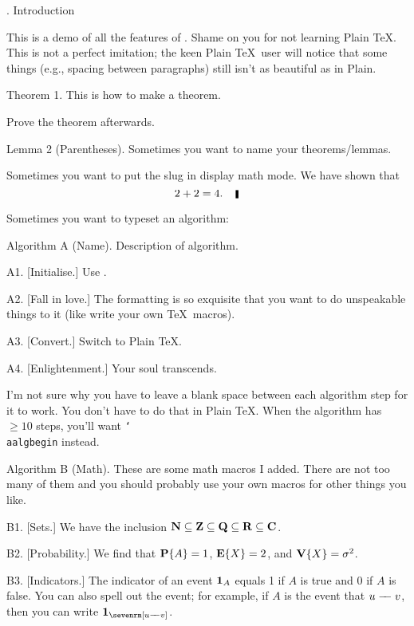 \documentclass[10pt]{article}
\begin{document}

. Introduction

This is a demo of all the features of \GohLaTeX. Shame on you for not learning Plain \TeX. This
is not a perfect imitation; the keen Plain \TeX\ user will notice that some things (e.g., spacing
between paragraphs) still isn't as beautiful as in Plain.

\proclaim Theorem 1. This is how to make a theorem.

\proof Prove the theorem afterwards.\slug

\parenproclaim Lemma 2 (Parentheses). Sometimes you want to name your theorems/lemmas.

\solution Sometimes you want to put the slug in display math mode. We have shown that
$$2+2 = 4.\noskipslug$$

Sometimes you want to typeset an algorithm:

\algbegin Algorithm A (Name). Description of algorithm.

\algstep A1. [Initialise.] Use \GohLaTeX.

\algstep A2. [Fall in love.] The formatting is so exquisite that you want to do unspeakable things to it (like
write your own \TeX\ macros).

\algstep A3. [Convert.] Switch to Plain \TeX.

\algstep A4. [Enlightenment.] Your soul transcends.\slug

I'm not sure why you have to leave a blank space between each algorithm step for it to work. You don't have
to do that in Plain \TeX. When the algorithm has $\geq 10$ steps, you'll want {\tt \char`\\aalgbegin} instead.

\aalgbegin Algorithm B (Math). These are some math macros I added. There are not too many of them and you
should probably use your own macros for other things you like.

\algstep B1. [Sets.] We have the inclusion ${\bf N}\subseteq {\bf Z} \subseteq {\bf Q}\subseteq  {\bf R}\subseteq  {\bf C}$.

\algstep B2. [Probability.] We find that $\mathop{\hbox{\bf P}}\nolimits\{A\} = 1$, $\mathop{\hbox{\bf E}}\nolimits\{X\} = 2$, and $\mathop{\hbox{\bf V}}\nolimits\{X\} = \sigma^2$.

\algstep B3. [Indicators.] The indicator of an event $\mathop{\hbox{\bf 1}}\nolimits_A$ equals 1 if $A$ is true and 0 if $A$ is false.
You can also spell out the event; for example, if $A$ is the event that $u\mathrel-\!\!\mathrel- v$, then you can
write $\indic{u\edge v}$.
\end{document}
